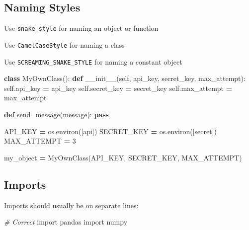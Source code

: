 \documentclass[
]{book}
\newenvironment{Shaded}{\begin{snugshade}}{\end{snugshade}}
\newcommand{\CommentTok}[1]{\textcolor[rgb]{0.56,0.35,0.01}{\textit{#1}}}
\newcommand{\ControlFlowTok}[1]{\textcolor[rgb]{0.13,0.29,0.53}{\textbf{#1}}}
\newcommand{\DecValTok}[1]{\textcolor[rgb]{0.00,0.00,0.81}{#1}}
\newcommand{\FunctionTok}[1]{\textcolor[rgb]{0.00,0.00,0.00}{#1}}
\newcommand{\ImportTok}[1]{#1}
\newcommand{\KeywordTok}[1]{\textcolor[rgb]{0.13,0.29,0.53}{\textbf{#1}}}
\newcommand{\NormalTok}[1]{#1}
\newcommand{\OperatorTok}[1]{\textcolor[rgb]{0.81,0.36,0.00}{\textbf{#1}}}
\newcommand{\StringTok}[1]{\textcolor[rgb]{0.31,0.60,0.02}{#1}}
\newcommand{\VariableTok}[1]{\textcolor[rgb]{0.00,0.00,0.00}{#1}}
\begin{document}
\hypertarget{naming-styles}{%
\subsection{Naming Styles}\label{naming-styles}}

Use \texttt{snake\_style} for naming an object or function

Use \texttt{CamelCaseStyle} for naming a class

Use \texttt{SCREAMING\_SNAKE\_STYLE} for naming a constant object

\begin{Shaded}
\begin{Highlighting}[]
\KeywordTok{class}\NormalTok{ MyOwnClass():}
    \KeywordTok{def} \FunctionTok{\_\_init\_\_}\NormalTok{(}\VariableTok{self}\NormalTok{, api\_key, secret\_key, max\_attempt):}
        \VariableTok{self}\NormalTok{.api\_key }\OperatorTok{=}\NormalTok{ api\_key}
        \VariableTok{self}\NormalTok{.secret\_key }\OperatorTok{=}\NormalTok{ secret\_key}
        \VariableTok{self}\NormalTok{.max\_attempt }\OperatorTok{=}\NormalTok{ max\_attempt}

    \KeywordTok{def}\NormalTok{ send\_message(message):}
        \ControlFlowTok{pass}

\NormalTok{API\_KEY }\OperatorTok{=}\NormalTok{ os.environ([}\StringTok{\textquotesingle{}api\textquotesingle{}}\NormalTok{])}
\NormalTok{SECRET\_KEY }\OperatorTok{=}\NormalTok{ os.environ([}\StringTok{\textquotesingle{}secret\textquotesingle{}}\NormalTok{])}
\NormalTok{MAX\_ATTEMPT }\OperatorTok{=} \DecValTok{3} 

\NormalTok{my\_object }\OperatorTok{=}\NormalTok{ MyOwnClass(API\_KEY, SECRET\_KEY, MAX\_ATTEMPT)}
\end{Highlighting}
\end{Shaded}

\hypertarget{imports}{%
\subsection{Imports}\label{imports}}

Imports should usually be on separate lines:

\begin{Shaded}
\begin{Highlighting}[]
\CommentTok{\# Correct }
\ImportTok{import}\NormalTok{ pandas }
\ImportTok{import}\NormalTok{ numpy }
\end{Highlighting}
\end{Shaded}
\end{document}
